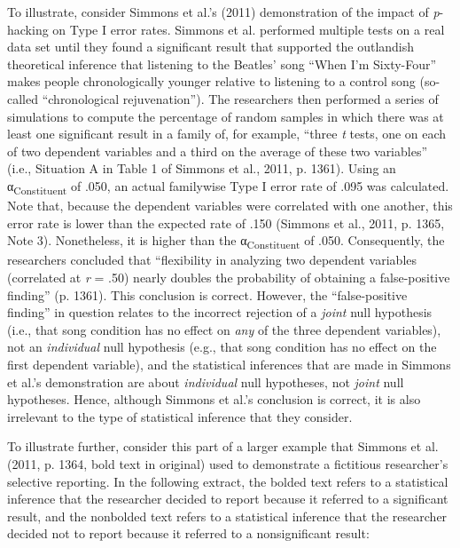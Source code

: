\documentclass[authordate, empirical]{jote-new-article}
\begin{document}
	To illustrate, consider Simmons et al.'s (2011) demonstration of the impact of \emph{p}-hacking on Type I error rates. Simmons et al. performed multiple tests on a real data set until they found a significant result that supported the outlandish theoretical inference that listening to the Beatles' song “When I'm Sixty-Four” makes people chronologically younger relative to listening to a control song (so-called “chronological rejuvenation”). The researchers then performed a series of simulations to compute the percentage of random samples in which there was at least one significant result in a family of, for example, “three \emph{t }tests, one on each of two dependent variables and a third on the average of these two variables” (i.e., Situation A in Table 1 of Simmons et al., 2011, p. 1361). Using an α\textsubscript{Constituent} of .050, an actual familywise Type I error rate of .095 was calculated. Note that, because the dependent variables were correlated with one another, this error rate is lower than the expected rate of .150 (Simmons et al., 2011, p. 1365, Note 3). Nonetheless, it is higher than the α\textsubscript{Constituent} of .050. Consequently, the researchers concluded that “flexibility in analyzing two dependent variables (correlated at \emph{r} = .50) nearly doubles the probability of obtaining a false-positive finding” (p. 1361). This conclusion is correct. However, the “false-positive finding” in question relates to the incorrect rejection of a \emph{joint} null hypothesis (i.e., that song condition has no effect on \emph{any} of the three dependent variables), not an \emph{individual} null hypothesis (e.g., that song condition has no effect on the first dependent variable), and the statistical inferences that are made in Simmons et al.'s demonstration are about \emph{individual} null hypotheses, not \emph{joint} null hypotheses. Hence, although Simmons et al.'s conclusion is correct, it is also irrelevant to the type of statistical inference that they consider.



	To illustrate further, consider this part of a larger example that Simmons et al. (2011, p. 1364, bold text in original) used to demonstrate a fictitious researcher's selective reporting. In the following extract, the bolded text refers to a statistical inference that the researcher decided to report because it referred to a significant result, and the nonbolded text refers to a statistical inference that the researcher decided not to report because it referred to a nonsignificant result:
\end{document}

